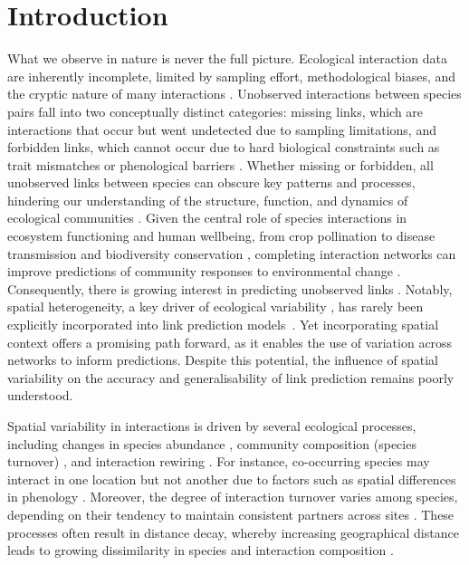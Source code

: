 \documentclass[oneside, a4paper, onecolumn, 11pt]{article}
\begin{document}
\begin{abstract}
\textit{Keywords}: ecological networks, island biogeography, link prediction, network embedding, pollination, spatial variability 
\end{abstract}


\section{Introduction}

What we observe in nature is never the full picture. Ecological interaction data are inherently incomplete, limited by sampling effort, methodological biases, and the cryptic nature of many interactions \citep{Chacoff2012-qt,Souza2022-os,Jordano2016-zj,Llopis-Belenguer2023-kv}. Unobserved interactions between species pairs fall into two conceptually distinct categories: missing links, which are interactions that occur but went undetected due to sampling limitations, and forbidden links, which cannot occur due to hard biological constraints such as trait mismatches or phenological barriers \citep{Olesen2011-js}. Whether missing or forbidden, all unobserved links between species can obscure key patterns and processes, hindering our understanding of the structure, function, and dynamics of ecological communities \citep{Peralta2024-xy}. Given the central role of species interactions in ecosystem functioning and human wellbeing, from crop pollination to disease transmission and biodiversity conservation \citep{Derocles2018-yk,Poisot2023-bi}, completing interaction networks can improve predictions of community responses to environmental change \citep{Tylianakis2008-iw,Pearse2013-nx}. Consequently, there is growing interest in predicting unobserved links \citep{Peralta2024-xy,Desjardins-Proulx2017-oh,Rohr2016-yy,Terry2020-wv,Strydom2021-aq,Pichler2020-vk,Biton2025-jj}. Notably, spatial heterogeneity, a key driver of ecological variability \citep{Poisot2012-lp,Dupont2009-yh}, has rarely been explicitly incorporated into link prediction models~\citep{Sydenham2022-me,Dormann2025-rz}. Yet incorporating spatial context offers a promising path forward, as it enables the use of variation across networks to inform predictions. 
Despite this potential, the influence of spatial variability on the accuracy and generalisability of link prediction remains poorly understood.

Spatial variability in interactions is driven by several ecological processes, including changes in species abundance \citep{Vazquez2007-tr}, community composition (species turnover) \citep{Vazquez2009-wu}, and interaction rewiring \citep{Tylianakis2017-ft,Trojelsgaard2015-aq}. For instance, co-occurring species may interact in one location but not another due to factors such as spatial differences in phenology \citep{Carstensen2014-hl,Olesen2011-js}. Moreover, the degree of interaction turnover varies among species, depending on their tendency to maintain consistent partners across sites  \citep{Trojelsgaard2015-aq,Fortuna2020-vy,Galai2024-hr}. These processes often result in distance decay, whereby increasing geographical distance leads to growing dissimilarity in species and interaction composition \citep{Baselga2010-mt,Trojelsgaard2015-aq,Vitali2024-gt,Soininen2007-mr}.
\end{document}
